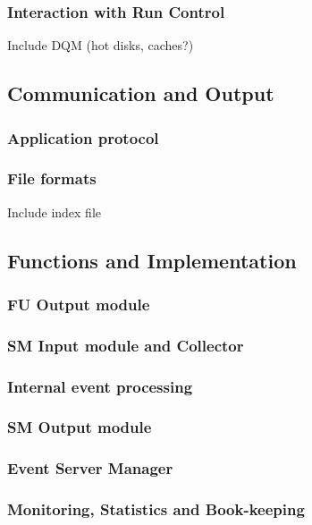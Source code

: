 \subsubsection{Interaction with Run Control}

Include DQM (hot disks, caches?)


\subsection{Communication and Output}

\subsubsection{Application protocol}




\subsubsection{File formats}

Include index file

\subsection{Functions and Implementation}

\subsubsection{FU Output module}

\subsubsection{SM Input module and Collector}

\subsubsection{Internal event processing}

\subsubsection{SM Output module}

\subsubsection{Event Server Manager}

\subsubsection{Monitoring, Statistics and Book-keeping}
